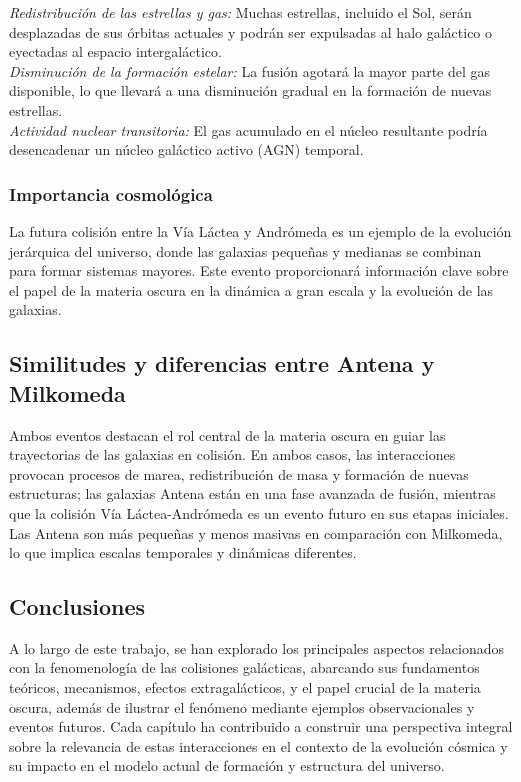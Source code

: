 \documentclass{article}
\begin{document}
\textit{Redistribución de las estrellas y gas:} Muchas estrellas, incluido el Sol, serán desplazadas de sus órbitas actuales y podrán ser expulsadas al halo galáctico o eyectadas al espacio intergaláctico. \\
\textit{Disminución de la formación estelar:} La fusión agotará la mayor parte del gas disponible, lo que llevará a una disminución gradual en la formación de nuevas estrellas. \\
\textit{Actividad nuclear transitoria:} El gas acumulado en el núcleo resultante podría desencadenar un núcleo galáctico activo (AGN) temporal.
\subsubsection*{Importancia cosmológica}

La futura colisión entre la Vía Láctea y Andrómeda es un ejemplo de la evolución jerárquica del universo, donde las galaxias pequeñas y medianas se combinan para formar sistemas mayores. Este evento proporcionará información clave sobre el papel de la materia oscura en la dinámica a gran escala y la evolución de las galaxias.
\subsection*{Similitudes y diferencias entre Antena y Milkomeda}

Ambos eventos destacan el rol central de la materia oscura en guiar las trayectorias de las galaxias en colisión. En ambos casos, las interacciones provocan procesos de marea, redistribución de masa y formación de nuevas estructuras; las galaxias Antena están en una fase avanzada de fusión, mientras que la colisión Vía Láctea-Andrómeda es un evento futuro en sus etapas iniciales. Las Antena son más pequeñas y menos masivas en comparación con Milkomeda, lo que implica escalas temporales y dinámicas diferentes.

\subsection*{Conclusiones}

A lo largo de este trabajo, se han explorado los principales aspectos relacionados con la fenomenología de las colisiones galácticas, abarcando sus fundamentos teóricos, mecanismos, efectos extragalácticos, y el papel crucial de la materia oscura, además de ilustrar el fenómeno mediante ejemplos observacionales y eventos futuros. Cada capítulo ha contribuido a construir una perspectiva integral sobre la relevancia de estas interacciones en el contexto de la evolución cósmica y su impacto en el modelo actual de formación y estructura del universo. \\
\end{document}

